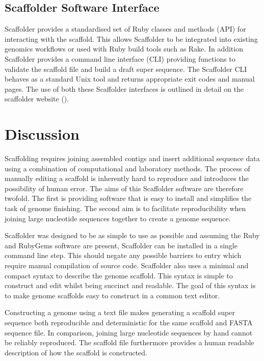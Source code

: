 \documentclass[10pt]{bmc_article}
\newenvironment{bmcformat}{\begin{raggedright}\baselineskip20pt\sloppy\setboolean{publ}{false}}{\end{raggedright}\baselineskip20pt\sloppy}
\begin{document}
\begin{bmcformat}
\subsection{Scaffolder Software Interface} %

Scaffolder provides a standardised set of Ruby classes and methods (API) for
interacting with the scaffold. This allows Scaffolder to be integrated into
existing genomics workflows or used with Ruby build tools such as Rake. In
addition Scaffolder provides a command line interface (CLI) providing functions
to validate the scaffold file and build a draft super sequence. The Scaffolder
CLI behaves as a standard Unix tool and returns appropriate exit codes and
manual pages. The use of both these Scaffolder interfaces is outlined in detail
on the scaffolder website (\scaffolder). \pb

\section*{Discussion} %

Scaffolding requires joining assembled contigs and insert additional sequence
data using a combination of computational and laboratory methods. The process
of manually editing a scaffold is inherently hard to reproduce and introduces
the possibility of human error. The aims of this Scaffolder software are
therefore twofold. The first is providing software that is easy to install and
simplifies the task of genome finishing. The second aim is to facilitate
reproducibility when joining large nucleotide sequences together to create
a genome sequence. \pb

Scaffolder was designed to be as simple to use as possible and assuming the
Ruby and RubyGems software are present, Scaffolder can be installed in a single
command line step. This should negate any possible barriers to entry which
require manual compilation of source code. Scaffolder also uses a minimal and
compact syntax to describe the genome scaffold. This syntax is simple to
construct and edit whilst being succinct and readable. The goal of this syntax
is to make genome scaffolds easy to construct in a common text editor. \pb

Constructing a genome using a text file makes generating a scaffold super
sequence both reproducible and deterministic for the same scaffold and FASTA
sequence file. In comparison, joining large nucleotide sequences by hand cannot
be reliably reproduced. The scaffold file furthermore provides a human readable
description of how the scaffold is constructed. \pb


\end{bmcformat}
\end{document}
